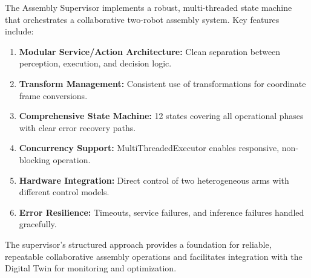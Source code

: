 The Assembly Supervisor implements a robust, multi-threaded state machine that orchestrates a collaborative two-robot assembly system. Key features include:

\begin{enumerate}
    \item \textbf{Modular Service/Action Architecture:} Clean separation between perception, execution, and decision logic.
    \item \textbf{Transform Management:} Consistent use of transformations for coordinate frame conversions.
    \item \textbf{Comprehensive State Machine:} 12 states covering all operational phases with clear error recovery paths.
    \item \textbf{Concurrency Support:} MultiThreadedExecutor enables responsive, non-blocking operation.
    \item \textbf{Hardware Integration:} Direct control of two heterogeneous arms with different control models.
    \item \textbf{Error Resilience:} Timeouts, service failures, and inference failures handled gracefully.
\end{enumerate}

The supervisor's structured approach provides a foundation for reliable, repeatable collaborative assembly operations and facilitates integration with the Digital Twin for monitoring and optimization.
\clearpage